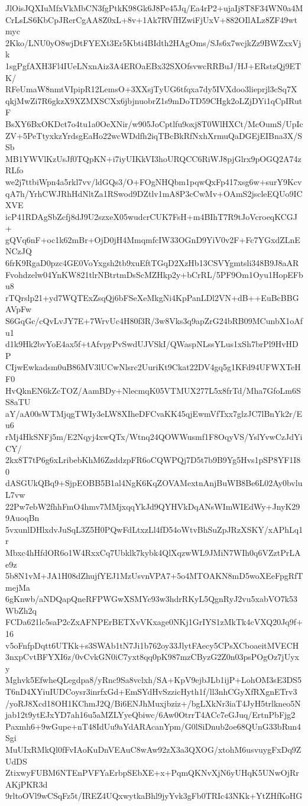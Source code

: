 JlOisJQXIuMfxVkMbCN3fgPtkK98Gk6J8Pe45Jq/Ea4rP2+ujaIj8T8F34WN0a4M
CrLsLS6KbCpJRerCgAA8Z0xL+8v+1Ak7RVfHZwiFjUxV+882OIlALz8ZF49wtmyc
2Kko/LNU0yO8wjDtFYEXt3Er5Kbti4BIdth2HAgOms/SJs6x7wcjkZz9BWZxxVjk
1sgPgfAXH3Fl4IUeLNxnAiz3A4EROaEBx32SXOfsvwcRRBuJ/HJ+ERstzQj9ETK/
RFeUmaW8nmtVIpipR12LemsO+3XXsjTyUG6tfqxa7dy5IVXdoo3lieprjl3cSq7X
qkjMwZi7R6gkzX9XZMXSCXx6jbjnuobrZ1s9mDoTD59CHgk2oLZjDYi1qCpIRutF
BsXY6BxOKDct7o4tu1a0OeXNir/w905JoCptlfu9oxj8T0WlHXCt/McOumS/UpIc
ZV+5PeTtyxkzYrdsgEaHo22wcWDdfh2iqTBcBkRfNxhXrmuQaDGEjEIBna3X/SSb
MB1YWVlKzUsJf0TQpKN+i7iyUIKkVI3hoURQCC6RiWJ8pjGlrx9pOGQ2A74zRLfo
we2j7ttbiWpn4a5rkl7vv/ldGQs3/O+FOgNHQbm1pqwQxFp417xsg6w+surY9Kcv
qA7h/YrhCWJRhHdNltZa1RSwod9DZtlv1mA8P3cCwMv+OAmS2jscleEQUo9ICXVE
icP41RDAgSbZcfj8dJ9U2szxeX05wudcrCUK7FsH+m4BIhT7R9tJoVcroeqKCGJ+
gQVq6nF+oc1k62mBr+OjD0jH4MmqmfcIW33OGnD9YiV0v2F+Fc7YGxdZLnENCzJQ
6frK9RgaD0pzc4GE0VoYxgsh2tb9xuEftTGqD2XzHb13CSVYgmtsli348B9J8aAR
Fvohdzelw04YnKW821tlrNBtrtmDsScMZHkp2y+bCrRL/5PF9Om1Oyu1HopEFbu8
rTQrslp21+yd7WQTExZsqQj6bFSeXeMkgNi4KpPanLDl2VN+dB++EuBcBBGAVpFw
S6GqGc/cQvLvJY7E+7WrvUc4H80f3R/3w8Vks3q9apZrG24bRB09MCunbX1oAfu1
d1k9Hk2bvYoE4ax5f+tAfvpyPvSwdUJVSkI/QWaspNLssYLus1xSh7brPl9HvHDP
CIjwEwkadsm0uB86MV3lUCwNlsrc2UuriKt9Ckat22DV4gq5g1KFd94UFWXTeHF0
HvQknEN6kZcTOZ/AamBDy+NlecmqK05VTMUX277L5x8frTd/Mha7GfoLm6SS8aTU
aY/aA00sWTMjqgTWIy3eLW8XIheDFCvaKK45qjEwmVfTxx7glzJC7lBnYk2r/Eu6
rMj4HkSNFj5m/E2Nqyj4xwQTx/Wtnq24QOWWusmf1F8OqyVS/YslYvwCzJdYiCY/
2kx8T7tP6g6xLribebKhM6ZzddzpFR6oCQWPQj7D5t7b9B9Yg5Hvs1pSP8YF1I80
dASGUkQBq9+SjpEOBB5B1al4NgK6KqZOVAMextnAnjBuWB8Be6L02Ay0bvluL7vw
22Pw7ebW2fhhFmO4hmv7MMjxqqYkJd9QYHVkDqANsWImWIEdWy+JnyK299AuoqBn
5vxunlDHlxdvJuSqL3Z5H0PQwFdLtxzLl4fD54oWtvBhSuZpJRzXSKY/xAPhLq1r
Mbxc4hHfdOR6o1W4RxxCq7Ubklk7kybk4QlXqzwWL9JMiN7WIh0q6VZztPrLAe9z
5b8N1vM+JA1H08dZhujfYEJ1MzUsvnVPA7+5o4MTOAKN8mD5woXEeFpgRfTmejMa
6gKnwb/aNDQapQneRFPWGwXSMYc93w3hdrRKyL5QgnRyJ2vu5xabVO7k53WbZh2q
FCDa621lc5saP2cZxAFNPErBETXvVKxage0NKj1GrIYS1zMkTk4cVXQ20Jq9f+16
v5oFnfpDqtt6UTKk+s3SWAb1tN7Ji1b762oy33JlytFAecy5CPsXCboaeitMVECH
3nxpCvtBFYXI6z/0vCvkGN0iC7yxt8qq0pK987mzCByzG2Z0n03psPOgOz7jUyxy
Mghvk5EfwheQLegdpa8/yRnc9Sa8vclxh/SA+KpV9ejbJLb1ijP+LohOM3sE3DS5
T6nD4XYiuIUDCoysr3inrfxGd+EmSYdHvSzzicHyth1f/ll3nhCGyXfRXgnETrv3
/yoRJ8Xcd18OH1KChmJ2Q/Bi6ENJhMuxjbziz+/bgLXkNr3iaT4JyH5trlkneo5N
jab12t9ytEJxYD7ah16u5aMZLYyeQbiwc/6Aw0OtrrT4ACc7eGJuq/ErtnPbFjg2
Paxmh6+9wGupe+nT48IdUu9aYdARAcanYpm/G0lSiDnub2oe68QUnG33bRun4Sgi
MuUIxRMkQl0fFvIAoKuDnVEAuC8wAw92zX3a3QXOG/xtohM6usvuygFxDq9ZUdDS
ZtixwyFUBM6NTEnPVFYaErbpSEbXE+x+PqmQKNvXjN6yUHqK5UNwOjRrAKjPKR3d
9rltoOVl9wCSqFz5t/IREZ4UQxwytkaBhl9jyYvk3gFb0TRIc43NKk+YtZHfKoHG
